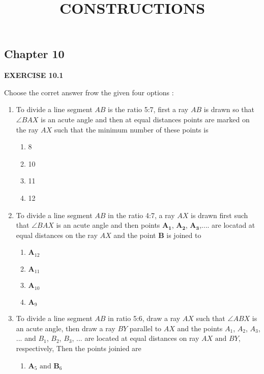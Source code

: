 \documentclass[12pt]{article}
\let\vec\mathbf
\begin{document}
\begin{center}
\enlargethispage{-4cm}
\title{\textbf{CONSTRUCTIONS}}
\date{\vspace{-5ex}} %
\maketitle
\end{center}
\setcounter{page}{1}
\begin{center}
\section*{Chapter 10}
\textbf{EXERCISE 10.1}
\end{center}
Choose the corret answer frow the given four options :
\begin{enumerate}
\item To divide a line segment $AB$ is the ratio 5:7, first a ray $AB$ is drawn so that $\angle{BAX}$ is an acute angle and then at equal distances points are marked on the ray $AX$ such that the minimum number of these points is 
\begin{enumerate}
\item 8
\item 10
\item 11
\item 12
\end{enumerate}
\item To divide a line segment $AB$ in the ratio 4:7, a ray $AX$ is drawn first such that $\angle{BAX}$ is an acute angle and then points $\vec{A_1}$, $\vec{A_2}$, $\vec{A_3}$,.... are locatad at equal distances on the ray $AX$ and the point $\vec{B}$ is joined to 
\begin{enumerate}
	\item $\vec{A}_{12}$
	\item $\vec{A}_{11}$
	\item $\vec{A}_{10}$
	\item $\vec{A}_9$
\end{enumerate}
\item To divide a line segment $AB$ in ratio 5:6, draw a ray $AX$ such that $\angle{ABX}$ is an acute angle, then draw a ray $BY$ parallel to $AX$ and the points $A_1$, $A_2$, $A_3$, ... and $B_1$, $B_2$, $B_3$, ... are located at equal distances on ray $AX\text{ and }BY$, respectively, Then the points joinied are 
\begin{enumerate}
\item $\vec{A}_5\text{ and }\vec{B}_6$

\end{enumerate}
\end{enumerate}
\end{document}
